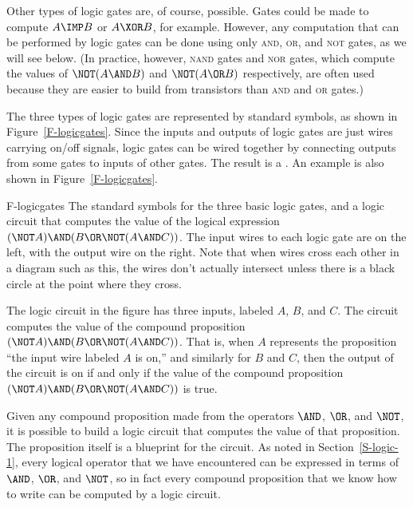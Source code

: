 Other types of logic gates are, of course, possible.  Gates could
be made to compute $A\IMP B$ or $A\XOR B$, for example.  However,
any computation that can be performed by logic gates can be 
done using only \textsc{and}, \textsc{or}, and \textsc{not} gates,
as we will see below.  (In practice, however, \textsc{nand} gates and
\textsc{nor} gates, which compute the values of $\NOT(A\AND B)$
and $\NOT(A\OR B)$ respectively, are often used because they
are easier to build from transistors than \textsc{and} and \textsc{or}
gates.)

The three types of logic gates are represented by standard symbols,
as shown in Figure~\ref{F-logicgates}.  Since the inputs and outputs
of logic gates are just wires carrying on/off signals, logic gates
can be wired together by connecting outputs from some gates to
inputs of other gates.  The result is a .
An example is also shown in Figure~\ref{F-logicgates}.

\fig
   {F-logicgates}
   {The standard symbols for the three basic logic gates, and a
    logic circuit that computes the value of the logical
    expression $(\NOT A)\AND(B\OR\NOT(A\AND C))$.  The input wires to
    each logic gate are on the left, with the output wire on the
    right.  Note that when wires cross each other in a diagram
    such as this, the wires don't actually intersect unless
    there is a black circle at the point where they cross.}
   {  }
   

The logic circuit in the figure has three inputs, labeled
$A$, $B$, and $C$.  The circuit computes the value of the
compound proposition $(\NOT A)\AND(B\OR\NOT(A\AND C))$.
That is, when $A$ represents the proposition ``the input wire
labeled $A$ is on,'' and similarly for $B$ and $C$, then
the output of the circuit is on if and only if the
value of the compound proposition $(\NOT A)\AND(B\OR\NOT(A\AND C))$
is true.

Given any compound proposition made from the operators
$\AND$, $\OR$, and $\NOT$, it is possible to build a logic
circuit
that computes the value of that proposition.  The
proposition itself is a blueprint for the circuit.  As noted
in Section~\ref{S-logic-1}, every logical operator that we have 
encountered can be expressed in terms of $\AND$, $\OR$, and $\NOT$,
so in fact every compound proposition that we know how to write
can be computed by a logic circuit. 

